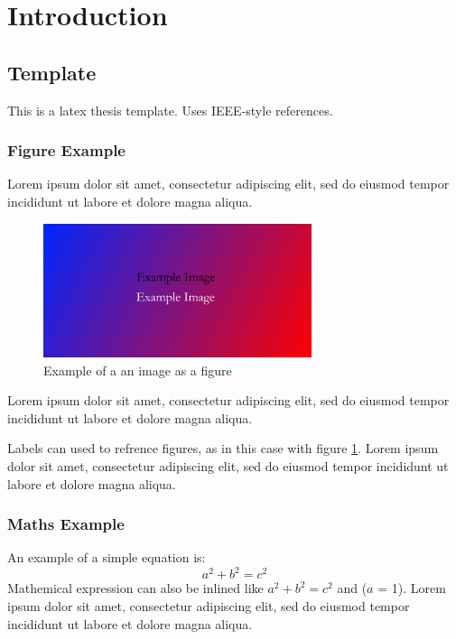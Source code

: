\section{Introduction}

\subsection{Template}

This is a \gls{latex} thesis template. Uses IEEE-style references\cite{Nescio2024}.

\subsubsection{Figure Example}

Lorem ipsum dolor sit amet, consectetur adipiscing elit, sed do eiusmod tempor incididunt ut labore et dolore magna aliqua.

\begin{figure}[h]
\centering
\label{fig:eximg}
\includegraphics[width=0.7\textwidth]{figures/example/example-image}
\caption{Example of a an image as a figure}
\end{figure}

Lorem ipsum dolor sit amet, consectetur adipiscing elit, sed do eiusmod tempor incididunt ut labore et dolore magna aliqua.

Labels can used to refrence figures, as in this case with figure \ref{fig:eximg}. Lorem ipsum dolor sit amet, consectetur adipiscing elit, sed do eiusmod tempor incididunt ut labore et dolore magna aliqua.

\subsubsection{Maths Example}

An example of a simple equation is:
\begin{equation}
a^2 + b^2 = c^2
\end{equation}
Mathemical expression can also be inlined like \(a^2 + b^2 = c^2\) and ($a$ = 1). Lorem ipsum dolor sit amet, consectetur adipiscing elit, sed do eiusmod tempor incididunt ut labore et dolore magna aliqua.

